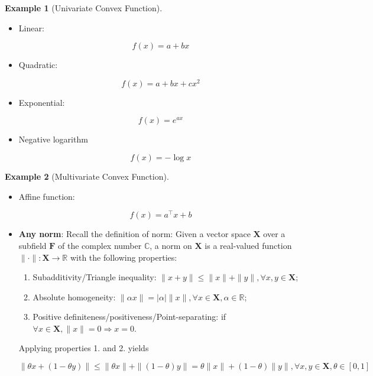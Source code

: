 \documentclass[12pt]{article} %
\theoremstyle{definition}
\newtheorem{example}{Example}
\newcommand{\Real}{\mathbb{R}}
\begin{document}
\begin{example}[Univariate Convex Function]
	\hspace{1mm} \\
	\begin{itemize}
		\item Linear:

		$$
			f(x) = a + bx
		$$

		\item Quadratic:

		$$
			f(x) = a + bx + cx^2
		$$

		\item Exponential:

		$$
			f(x) = e^{ax}
		$$

		\item Negative logarithm

		$$
			f(x) = -\log x
		$$
	\end{itemize}
\end{example}

\vspace{1mm}

\begin{example}[Multivariate Convex Function]
	\hspace{1mm} \\
	\begin{itemize}
		\item Affine function:

		$$
			f(x) = a^\intercal x + b
		$$

		\item \color{red}\textbf{Any norm}\color{black}: Recall the definition of norm: Given a vector space $\mathbf{X}$ over a subfield $\mathbf{F}$ of the complex number $\mathbb{C}$, a norm on $\mathbf{X}$ is a real-valued function $\| \cdot \|: \mathbf{X} \rightarrow \Real$ with the following properties:

		\begin{enumerate}
			\item Subadditivity/Triangle inequality: $\|x + y\| \le \|x\| + \|y\|, \forall x, y \in \mathbf{X}$;
		
			\item Absolute homogeneity: $\|\alpha x\| = |\alpha| \|x\|, \forall x \in \mathbf{X}, \alpha \in \Real$;

			\item Positive definiteness/positiveness/Point-separating: if $\forall x \in \mathbf{X}, \|x\| = 0 \Rightarrow x = 0$.
		\end{enumerate}

		Applying properties 1. and 2. yields

		$$
			\| \theta x + (1 - \theta y)\| \le \| \theta x \| + \| (1 - \theta) y \| = \theta \|x\| + (1 - \theta) \|y\|, \forall x, y \in \mathbf{X}, \theta \in [0, 1]
		$$
	\end{itemize}
\end{example}
\end{document}
